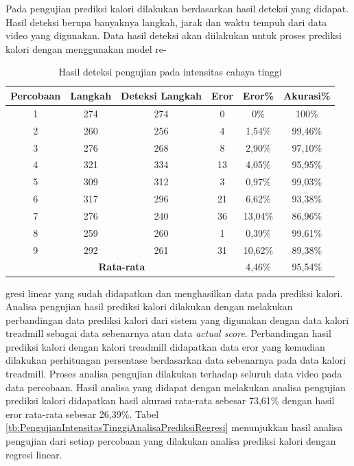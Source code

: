 Pada pengujian prediksi kalori dilakukan berdasarkan hasil deteksi yang didapat. Hasil deteksi berupa banyaknya langkah, jarak dan waktu tempuh dari data video yang digunakan. Data hasil deteksi akan diilakukan untuk proses prediksi kalori dengan menggunakan model re- 

\begin{longtable}{|c|c|c|c|c|c|}
  \caption{Hasil deteksi pengujian pada intensitas cahaya tinggi}
  \label{tb:PengujianIntensitasTinggiAnalisaDeteksi}                                   \\
  \hline
  \rowcolor[HTML]{C0C0C0}
  \textbf{Percobaan} & \textbf{Langkah} & \textbf{Deteksi Langkah} & \textbf{Eror} & \textbf{Eror\%} & \textbf{Akurasi\%} \\
  \hline
  1   & 274   & 274 & 0    & 0\%        & 100\%   \\
  \hline
  2   & 260   & 256 & 4    & 1,54\%     & 99,46\%   \\
  \hline
  3   & 276   & 268 & 8    & 2,90\%     & 97,10\%     \\
  \hline
  4   & 321   & 334 & 13   & 4,05\%     & 95,95\%   \\
  \hline
  5   & 309   & 312 & 3    & 0,97\%     & 99,03\%   \\
  \hline
  6   & 317   & 296 & 21   & 6,62\%     & 93,38\%   \\
  \hline
  7   & 276   & 240 & 36   & 13,04\%    & 86,96\%   \\
  \hline
  8   & 259   & 260 & 1    & 0,39\%     & 99,61\%   \\
  \hline
  9   & 292   & 261 & 31   & 10,62\%    & 89,38\%   \\
  \hline
  

  \multicolumn{4}{|c|}{\textbf{Rata-rata}} & 4,46\% & 95,54\% \\
  \hline
\end{longtable}

\noindent
gresi linear yang sudah didapatkan dan menghasilkan data pada prediksi kalori. Analisa pengujian hasil prediksi kalori dilakukan dengan melakukan perbandingan data prediksi kalori dari sistem yang digunakan dengan data kalori treadmill sebagai data sebenarnya atau data \emph{actual score}. Perbandingan hasil prediksi kalori dengan kalori treadmill didapatkan data eror yang kemudian dilakukan perhitungan persentase berdasarkan data sebenarnya pada data kalori treadmill. Proses analisa pengujian dilakukan terhadap seluruh data video pada data percobaan. Hasil analisa yang didapat dengan melakukan analisa pengujian prediksi kalori didapatkan hasil akurasi rata-rata sebesar 73,61\% dengan hasil eror rata-rata sebesar 26,39\%. Tabel \ref{tb:PengujianIntensitasTinggiAnalisaPrediksiRegresi} menunjukkan hasil analisa pengujian dari setiap percobaan yang dilakukan analisa prediksi kalori dengan regresi linear.

